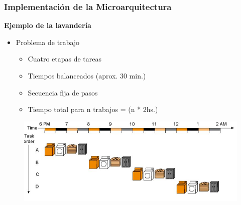 \documentclass[aspectratio=169,compress]{beamer}
\begin{document}
\begin{footnotesize}
\begin{frame}
\frametitle{Implementación de la Microarquitectura}
\begin{center}\textbf{Ejemplo de la lavandería}\end{center}
\begin{itemize}
\item Problema de trabajo
\begin{itemize}
\item Cuatro etapas de tareas
\item Tiempos balanceados (aprox. 30 min.)
\item Secuencia fija de pasos
\item Tiempo total para n trabajos = (n * 2hs.)
\end{itemize}
\end{itemize}
\begin{figure}
\includegraphics[scale=0.4]{images/lavanderia1.jpg} 
\end{figure}
\end{frame}





\end{footnotesize}
\end{document}
